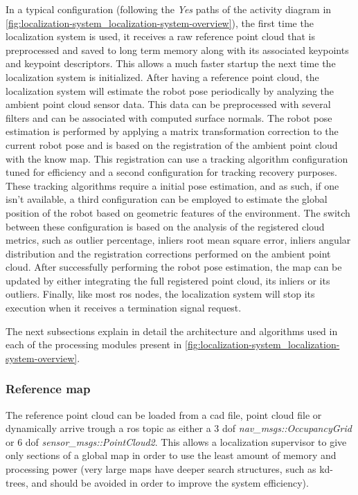 In a typical configuration (following the \emph{Yes} paths of the activity diagram in \cref{fig:localization-system_localization-system-overview}), the first time the localization system is used, it receives a raw reference point cloud that is preprocessed and saved to long term memory along with its associated keypoints and keypoint descriptors. This allows a much faster startup the next time the localization system is initialized. After having a reference point cloud, the localization system will estimate the robot pose periodically by analyzing the ambient point cloud sensor data. This data can be preprocessed with several filters and can be associated with computed surface normals. The robot pose estimation is performed by applying a matrix transformation correction to the current robot pose and is based on the registration of the ambient point cloud with the know map. This registration can use a tracking algorithm configuration tuned for efficiency and a second configuration for tracking recovery purposes. These tracking algorithms require a initial pose estimation, and as such, if one isn't available, a third configuration can be employed to estimate the global position of the robot based on geometric features of the environment. The switch between these configuration is based on the analysis of the registered cloud metrics, such as outlier percentage, inliers root mean square error, inliers angular distribution and the registration corrections performed on the ambient point cloud. After successfully performing the robot pose estimation, the map can be updated by either integrating the full registered point cloud, its inliers or its outliers. Finally, like most \gls{ros} nodes, the localization system will stop its execution when it receives a termination signal request.

The next subsections explain in detail the architecture and algorithms used in each of the processing modules present in \cref{fig:localization-system_localization-system-overview}.


\subsubsection{Reference map}

The reference point cloud can be loaded from a \gls{cad} file, point cloud file or dynamically arrive trough a \gls{ros} topic as either a 3 \gls{dof} \emph{nav\_msgs::OccupancyGrid} or 6 \gls{dof} \emph{sensor\_msgs::PointCloud2}. This allows a localization supervisor to give only sections of a global map in order to use the least amount of memory and processing power (very large maps have deeper search structures, such as kd-trees, and should be avoided in order to improve the system efficiency).



